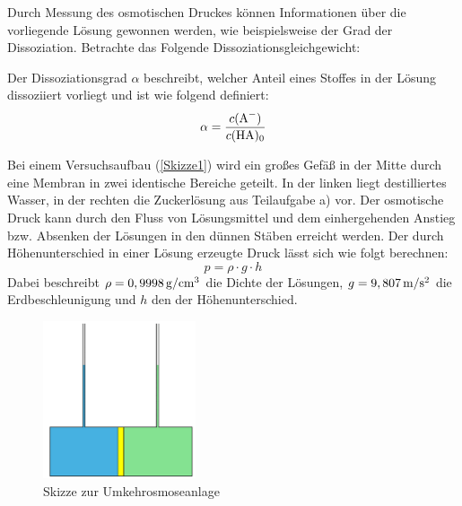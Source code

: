 \documentclass[../kl10.tex]{subfiles}
\begin{document}
Durch Messung des osmotischen Druckes können Informationen über die vorliegende Lösung gewonnen werden, wie beispielsweise der Grad der Dissoziation. Betrachte das Folgende Dissoziationsgleichgewicht:

\begin{center}
\end{center}

Der Dissoziationsgrad $\alpha$ beschreibt, welcher Anteil eines Stoffes in der Lösung dissoziiert vorliegt und ist wie folgend definiert: $$\alpha=\frac{c(\ce{A-})}{c(\ce{HA})_0}$$

\newpage



Bei einem Versuchsaufbau (\autoref{Skizze1}) wird ein großes Gefäß in der Mitte durch eine Membran in zwei identische Bereiche geteilt. In der linken liegt destilliertes Wasser, in der rechten die Zuckerlösung aus Teilaufgabe a) vor. Der osmotische Druck kann durch den Fluss von Lösungsmittel und dem einhergehenden Anstieg bzw. Absenken der Lösungen in den dünnen Stäben erreicht werden. Der durch Höhenunterschied in einer Lösung erzeugte Druck lässt sich wie folgt berechnen: $$p = \rho \cdot g \cdot h$$
Dabei beschreibt $\rho = 0,9998 \thinspace \mathrm{g/cm^3}$ die Dichte der Lösungen, $g = 9,807 \thinspace \mathrm{m/s^2}$ die Erdbeschleunigung und $h$ den der Höhenunterschied. 

\begin{figure}[H]
    \centering
    \includegraphics[width=0.4\textwidth]{2024/Abbildungen/Umkehrosmose/U_Rohr.png}
    \caption{Skizze zur Umkehrosmoseanlage}
    \label{Skizze1}
\end{figure}
\end{document}
